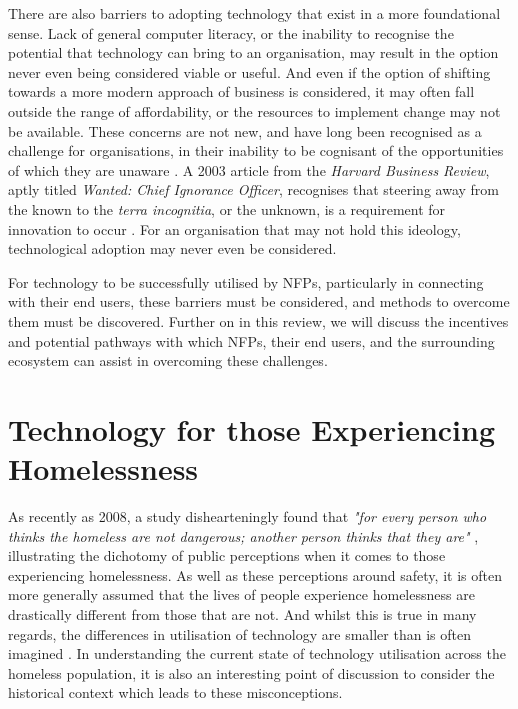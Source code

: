 There are also barriers to adopting technology that exist in a more foundational sense. Lack of general computer literacy, or the inability to recognise the potential that technology can bring to an organisation, may result in the option never even being considered viable or useful. And even if the option of shifting towards a more modern approach of business is considered, it may often fall outside the range of affordability, or the resources to implement change may not be available. These concerns are not new, and have long been recognised as a challenge for organisations, in their inability to be cognisant of the opportunities of which they are unaware \cite{benjamin1983information}. A 2003 article from the \emph{Harvard Business Review}, aptly titled \emph{Wanted: Chief Ignorance Officer}, recognises that steering away from the known to the \emph{terra incognitia}, or the unknown, is a requirement for innovation to occur \cite{gray2003wanted}. For an organisation that may not hold this ideology, technological adoption may never even be considered.

For technology to be successfully utilised by NFPs, particularly in connecting with their end users, these barriers must be considered, and methods to overcome them must be discovered. Further on in this review, we will discuss the incentives and potential pathways with which NFPs, their end users, and the surrounding ecosystem can assist in overcoming these challenges.

\section{Technology for those Experiencing Homelessness}

As recently as 2008, a study dishearteningly found that \emph{"for every person who thinks the homeless are not dangerous; another person thinks that they are"} \cite{donley2008perception}, illustrating the dichotomy of public perceptions when it comes to those experiencing homelessness. As well as these perceptions around safety, it is often more generally assumed that the lives of people experience homelessness are drastically different from those that are not. And whilst this is true in many regards, the differences in utilisation of technology are smaller than is often imagined \cite{le2008designs} \cite{pollio2013technology} \cite{rhoades2017no}. In understanding the current state of technology utilisation across the homeless population, it is also an interesting point of discussion to consider the historical context which leads to these misconceptions.

